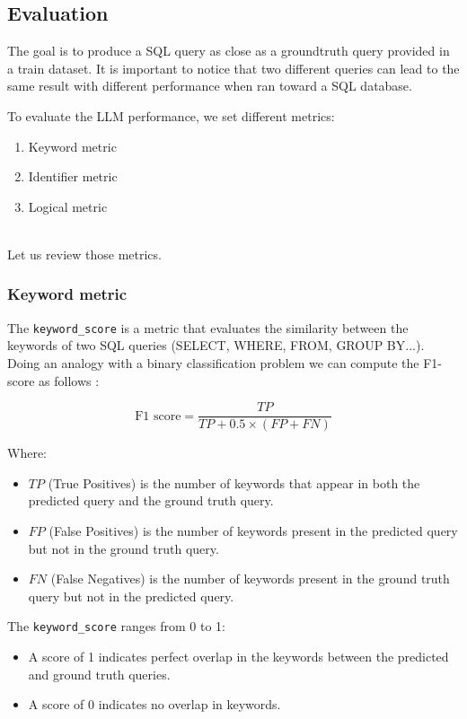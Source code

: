 \documentclass[12pt,a4paper]{article}
\begin{document}
\subsection*{Evaluation}
The goal is to produce a SQL query as close as a groundtruth query provided in a train dataset. It is important to notice that two different queries can lead to the same result with different performance when ran toward a SQL database.

To evaluate the LLM performance, we set different metrics:
\begin{enumerate}
    \item Keyword metric
    \item Identifier metric
    \item Logical metric
\end{enumerate}

\\
Let us review those metrics.

\subsubsection*{Keyword metric}

The \texttt{keyword\_score} is a metric that evaluates the similarity between the keywords of two SQL queries (SELECT, WHERE, FROM, GROUP BY...). Doing an analogy with a binary classification problem we can compute the F1-score as follows :

\[
\text{F1 score} = \frac{TP}{TP + 0.5 \times (FP + FN)}
\]

\noindent Where:

\begin{itemize}
  \item \( TP \) (True Positives) is the number of keywords that appear in both the predicted query and the ground truth query.
  \item \( FP \) (False Positives) is the number of keywords present in the predicted query but not in the ground truth query.
  \item \( FN \) (False Negatives) is the number of keywords present in the ground truth query but not in the predicted query.
\end{itemize}

\noindent The \texttt{keyword\_score} ranges from 0 to 1:
\begin{itemize}
  \item A score of 1 indicates perfect overlap in the keywords between the predicted and ground truth queries.
  \item A score of 0 indicates no overlap in keywords.
\end{itemize}
\end{document}
